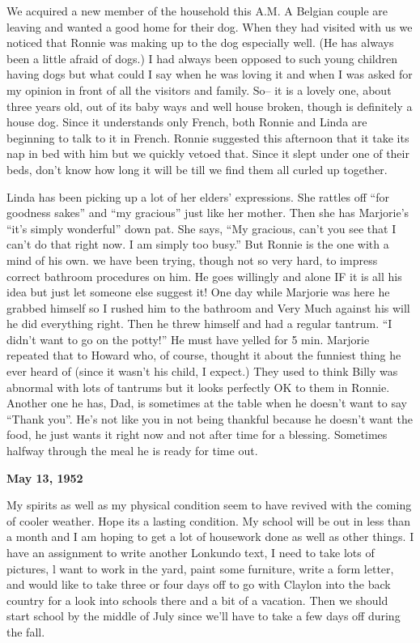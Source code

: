 \documentclass[]{book}
\begin{document}
We acquired a new member of the household this A.M. A Belgian couple are leaving and wanted a good home for their dog. When they had visited with us we noticed that Ronnie was making up to the dog especially well. (He has always been a little afraid of dogs.) I had always been opposed to such young children having dogs but what could I say when he was loving it and when I was asked for my opinion in front of all the visitors and family. So-- it is a lovely one, about three years old, out of its baby ways and well house broken, though is definitely a house dog. Since it understands only French, both Ronnie and Linda are beginning to talk to it in French. Ronnie suggested this afternoon that it take its nap in bed with him but we quickly vetoed that. Since it slept under one of their beds, don't know how long it will be till we find them all curled up together.

Linda has been picking up a lot of her elders' expressions. She rattles off ``for goodness sakes'' and ``my gracious'' just like her mother. Then she has Marjorie's ``it's simply wonderful'' down pat. She says, ``My gracious, can't you see that I can't do that right now. I am simply too busy.'' But Ronnie is the one with a mind of his own. we have been trying, though not so very hard, to impress correct bathroom procedures on him. He goes willingly and alone IF it is all his idea but just let someone else suggest it! One day while Marjorie was here he grabbed himself so I rushed him to the bathroom and Very Much against his will he did everything right. Then he threw himself and had a regular tantrum. ``I didn't want to go on the potty!'' He must have yelled for 5 min. Marjorie repeated that to Howard who, of course, thought it about the funniest thing he ever heard of (since it wasn't his child, I expect.) They used to think Billy was abnormal with lots of tantrums but it looks perfectly OK to them in Ronnie. Another one he has, Dad, is sometimes at the table when he doesn't want to say ``Thank you''. He's not like you in not being thankful because he doesn't want the food, he just wants it right now and not after time for a blessing. Sometimes halfway through the meal he is ready for time out.

\textbf{May 13, 1952}

My spirits as well as my physical condition seem to have revived with the coming of cooler weather. Hope its a lasting condition. My school will be out in less than a month and I am hoping to get a lot of housework done as well as other things. I have an assignment to write another Lonkundo text, I need to take lots of pictures, l want to work in the yard, paint some furniture, write a form letter, and would like to take three or four days off to go with Claylon into the back country for a look into schools there and a bit of a vacation. Then we should start school by the middle of July since we'll have to take a few days off during the fall.
\end{document}
